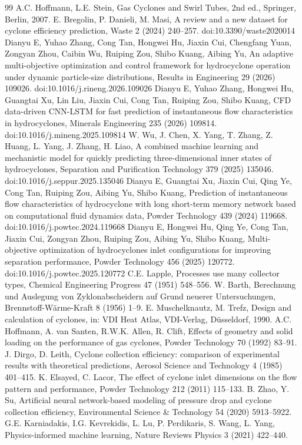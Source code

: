 \documentclass[12pt]{article}
\begin{document}
\begin{thebibliography}{99}\small
{}A.C. Hoffmann, L.E. Stein, Gas Cyclones and Swirl Tubes, 2nd ed., Springer, Berlin, 2007.
E. Bregolin, P. Danieli, M. Masi, A review and a new dataset for cyclone efficiency prediction, Waste 2 (2024) 240--257. doi:10.3390/waste2020014
Dianyu E, Yuhao Zhang, Cong Tan, Hongwei Hu, Jiaxin Cui, Chengfang Yuan, Zongyan Zhou, Caibin Wu, Ruiping Zou, Shibo Kuang, Aibing Yu, An adaptive multi-objective optimization and control framework for hydrocyclone operation under dynamic particle-size distributions, Results in Engineering 29 (2026) 109026. doi:10.1016/j.rineng.2026.109026
Dianyu E, Yuhao Zhang, Hongwei Hu, Guangtai Xu, Lin Liu, Jiaxin Cui, Cong Tan, Ruiping Zou, Shibo Kuang, CFD data-driven CNN-LSTM for fast prediction of instantaneous flow characteristics in hydrocyclones, Minerals Engineering 235 (2026) 109814. doi:10.1016/j.mineng.2025.109814
W. Wu, J. Chen, X. Yang, T. Zhang, Z. Huang, L. Yang, J. Zhang, H. Liao, A combined machine learning and mechanistic model for quickly predicting three-dimensional inner states of hydrocyclones, Separation and Purification Technology 379 (2025) 135046. doi:10.1016/j.seppur.2025.135046
Dianyu E, Guangtai Xu, Jiaxin Cui, Qing Ye, Cong Tan, Ruiping Zou, Aibing Yu, Shibo Kuang, Prediction of instantaneous flow characteristics of hydrocyclone with long short-term memory network based on computational fluid dynamics data, Powder Technology 439 (2024) 119668. doi:10.1016/j.powtec.2024.119668
Dianyu E, Hongwei Hu, Qing Ye, Cong Tan, Jiaxin Cui, Zongyan Zhou, Ruiping Zou, Aibing Yu, Shibo Kuang, Multi-objective optimization of hydrocyclones inlet configurations for improving separation performance, Powder Technology 456 (2025) 120772. doi:10.1016/j.powtec.2025.120772
C.E. Lapple, Processes use many collector types, Chemical Engineering Progress 47 (1951) 548--556.
W. Barth, Berechnung und Auslegung von Zyklonabscheidern auf Grund neuerer Untersuchungen, Brennstoff-W\"arme-Kraft 8 (1956) 1--9.
E. Muschelknautz, M. Trefz, Design and calculation of cyclones, in: VDI Heat Atlas, VDI-Verlag, D\"usseldorf, 1990.
A.C. Hoffmann, A. van Santen, R.W.K. Allen, R. Clift, Effects of geometry and solid loading on the performance of gas cyclones, Powder Technology 70 (1992) 83--91.
J. Dirgo, D. Leith, Cyclone collection efficiency: comparison of experimental results with theoretical predictions, Aerosol Science and Technology 4 (1985) 401--415.
K. Elsayed, C. Lacor, The effect of cyclone inlet dimensions on the flow pattern and performance, Powder Technology 212 (2011) 115--133.
B. Zhao, Y. Su, Artificial neural network-based modeling of pressure drop and cyclone collection efficiency, Environmental Science \& Technology 54 (2020) 5913--5922.
G.E. Karniadakis, I.G. Kevrekidis, L. Lu, P. Perdikaris, S. Wang, L. Yang, Physics-informed machine learning, Nature Reviews Physics 3 (2021) 422--440.
\end{thebibliography}
\end{document}
